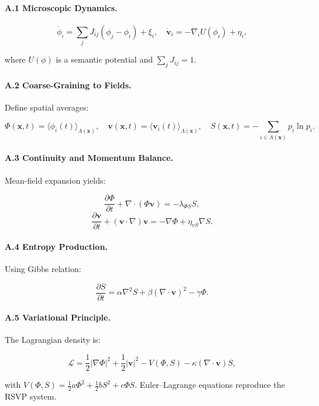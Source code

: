 \documentclass[12pt]{article}
\begin{document}
\paragraph{A.1 Microscopic Dynamics.}

\[
\dot{\phi}_i = \sum_{j} J_{ij} (\phi_j - \phi_i) + \xi_i, \quad \dot{\mathbf{v}}_i = -\nabla_i U(\phi_i) + \eta_i,
\]

where \(U(\phi)\) is a semantic potential and \(\sum_j J_{ij} = 1\).

\paragraph{A.2 Coarse-Graining to Fields.}

Define spatial averages:

\[
\Phi(\mathbf{x},t) = \langle \phi_i(t) \rangle_{\Lambda(\mathbf{x})}, \quad \mathbf{v}(\mathbf{x},t) = \langle \mathbf{v}_i(t) \rangle_{\Lambda(\mathbf{x})}, \quad S(\mathbf{x},t) = -\sum_{i \in \Lambda(\mathbf{x})} p_i \ln p_i.
\]

\paragraph{A.3 Continuity and Momentum Balance.}

Mean-field expansion yields:

\[
\frac{\partial \Phi}{\partial t} + \nabla \cdot (\Phi \mathbf{v}) = -\lambda_{\Phi S} S,
\]
\[
\frac{\partial \mathbf{v}}{\partial t} + (\mathbf{v} \cdot \nabla) \mathbf{v} = -\nabla \Phi + \eta_{vS} \nabla S.
\]

\paragraph{A.4 Entropy Production.}

Using Gibbs relation:

\[
\frac{\partial S}{\partial t} = \alpha \nabla^2 S + \beta (\nabla \cdot \mathbf{v})^2 - \gamma \Phi.
\]

\paragraph{A.5 Variational Principle.}

The Lagrangian density is:

\[
\mathcal{L} = \frac{1}{2} |\nabla \Phi|^2 + \frac{1}{2} |\mathbf{v}|^2 - V(\Phi, S) - \kappa (\nabla \cdot \mathbf{v}) S,
\]

with \( V(\Phi, S) = \frac{1}{2} a \Phi^2 + \frac{1}{2} b S^2 + c \Phi S \). Euler–Lagrange equations reproduce the RSVP system.
\end{document}
